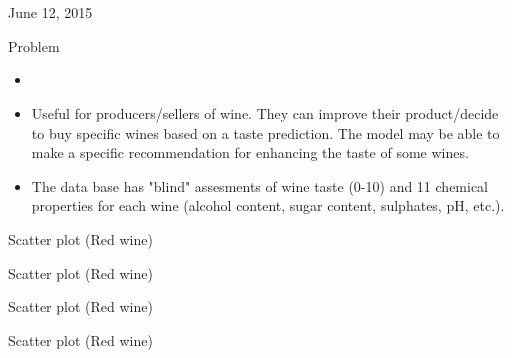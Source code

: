 \documentclass{mine}
\begin{document}
{
\begin{center}
\end{center}
\\
\\
}{June 12, 2015}

\begin{slide}{Problem}
    \vspace{3cm}
    \begin{itemize}
        \item{}
        \vspace{1cm}
        \item{Useful for producers/sellers of wine. They can improve their product/decide to buy specific wines
              based on a taste prediction. The model may be able to make a specific recommendation for enhancing the
              taste of some wines.}
       \vspace{1cm}
       \item{The data base has "blind" assesments of wine taste (0-10) and 11 chemical properties for each wine (alcohol
           content, sugar content, sulphates, pH, etc.).}
    \end{itemize}
\end{slide}

\begin{slide}{Scatter plot (Red wine)}
    \begin{center}
    \end{center}
\end{slide}

\begin{slide}{Scatter plot (Red wine)}
    \begin{center}
    \end{center}
\end{slide}

\begin{slide}{Scatter plot (Red wine)}
    \begin{center}
    \end{center}
\end{slide}

\begin{slide}{Scatter plot (Red wine)}
    \begin{center}
    \end{center}
\end{slide}
\end{document}
